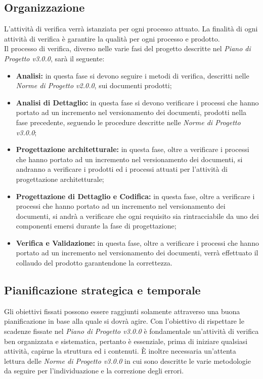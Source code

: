 \subsection{Organizzazione}
L'attività di verifica verrà istanziata per ogni processo attuato. La finalità di ogni attività di verifica è garantire la qualità per ogni processo e prodotto.\\
Il processo di verifica, diverso nelle varie fasi del progetto descritte nel \textit{Piano di Progetto v3.0.0}, sarà il seguente:
\begin{itemize}
	\item \textbf{Analisi:} in questa fase si devono seguire i metodi di verifica, descritti nelle \textit{Norme di Progetto v2.0.0}, sui documenti prodotti;
	\item \textbf{Analisi di Dettaglio:} in questa fase si devono verificare i processi che hanno portato ad un incremento nel \gls{versionamento} dei documenti, prodotti nella fase precedente, seguendo le procedure descritte nelle \textit{Norme di Progetto v3.0.0};
	\item \textbf{Progettazione architetturale:} in questa fase, oltre a verificare i processi che hanno portato ad un incremento nel \gls{versionamento} dei documenti, si andranno a verificare i prodotti ed i processi attuati per l'attività di progettazione architetturale;
	\item \textbf{Progettazione di Dettaglio e Codifica:} in questa fase, oltre a verificare i processi che hanno portato ad un incremento nel \gls{versionamento} dei documenti, si andrà a verificare che ogni requisito sia rintracciabile da uno dei componenti emersi durante la fase di progettazione;
	\item \textbf{Verifica e Validazione:} in questa fase, oltre a verificare i processi che hanno portato ad un incremento nel \gls{versionamento} dei documenti, verrà effettuato il collaudo del prodotto garantendone la correttezza.
\end{itemize} 

\subsection{Pianificazione strategica e temporale}
Gli obiettivi fissati possono essere raggiunti solamente attraverso una buona pianificazione in base alla quale si dovrà agire. Con l'obiettivo di rispettare le scadenze fissate nel \textit{Piano di Progetto v3.0.0} è fondamentale un'attività di verifica ben organizzata e sistematica, pertanto è essenziale, prima di iniziare qualsiasi attività, capirne la struttura ed i contenuti. È inoltre necessaria un'attenta lettura delle \textit{Norme di Progetto v3.0.0} in cui sono descritte le varie metodologie da seguire per l'individuazione e la correzione degli errori.

